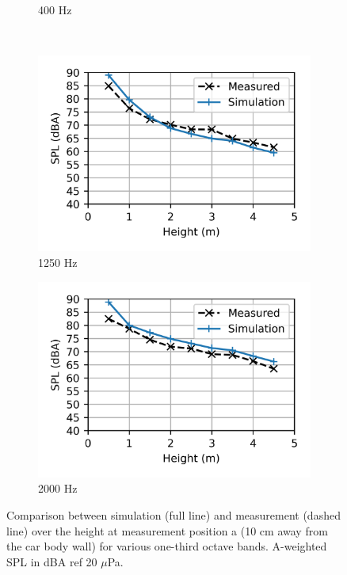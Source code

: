 \begin{figure}
\begin{subfigure}[b]{0.49\textwidth}
		\caption{400 Hz}
	\end{subfigure}
	\\
	\begin{subfigure}[b]{0.49\textwidth}
		\centering
		\includegraphics{fig/chap5/initial_model/third_octave_over_height/1250_Hz.png}
		\caption{1250 Hz}
	\end{subfigure}
	\hfill
	\begin{subfigure}[b]{0.49\textwidth}
		\centering
		\includegraphics{fig/chap5/initial_model/third_octave_over_height/2000_Hz.png}
		\caption{2000 Hz}
	\end{subfigure}
        \caption{Comparison between simulation (full line) and measurement (dashed line) over the height at measurement position a (10 cm away from the car body wall) for various one-third octave bands. A-weighted SPL in dBA ref 20 $\mu$Pa.}
	\label{fig:third_octave_over_height}
\end{figure}

